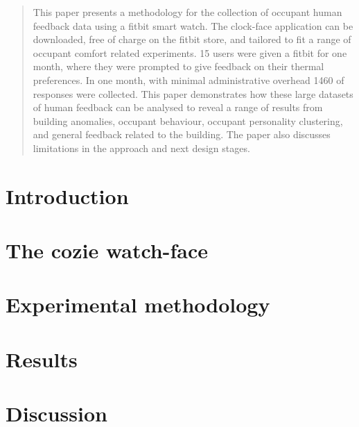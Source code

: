 \documentclass[a4paper]{jpconf} %
\begin{document}


\begin{abstract}

This paper presents a methodology for the collection of occupant human feedback data using a fitbit smart watch. The clock-face application can be downloaded, free of charge on the fitbit store, and tailored to fit a range of occupant comfort related experiments. 15 users were given a fitbit for one month, where they were prompted to give feedback on their thermal preferences. In one month, with minimal administrative overhead 1460 of responses were collected. This paper demonstrates how these large datasets of human feedback can be analysed to reveal a range of results from building anomalies, occupant behaviour, occupant personality clustering, and general feedback related to the building. The paper also discusses limitations in the approach and next design stages.



\end{abstract}



\section{Introduction}
\label{ch:introduction}


\section{The cozie watch-face}
\label{ch:cozie}


\section{Experimental methodology}
\label{ch:method}


\section{Results}
\label{ch:results}



\section{Discussion}
\label{ch:discussion}

\end{document}
